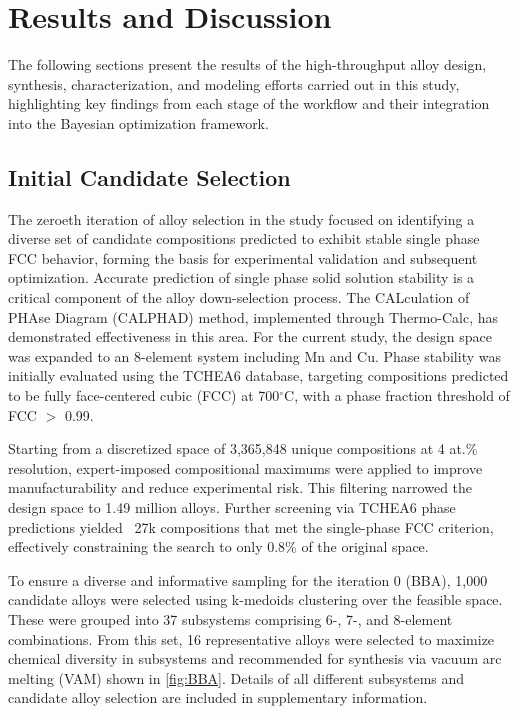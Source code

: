
\section{Results and Discussion}\label{sec:Results}

The following sections present the results of the high-throughput alloy design, synthesis, characterization, and modeling efforts carried out in this study, highlighting key findings from each stage of the workflow and their integration into the Bayesian optimization framework.

\subsection{Initial Candidate Selection}

The zeroeth iteration of alloy selection in the study focused on identifying a diverse set of candidate compositions predicted to exhibit stable single phase FCC behavior, forming the basis for experimental validation and subsequent optimization. Accurate prediction of single phase solid solution stability is a critical component of the alloy down-selection process. The CALculation of PHAse Diagram (CALPHAD) method, implemented through Thermo-Calc, has demonstrated effectiveness in this area. For the current study, the design space was expanded to an 8-element system including Mn and Cu. Phase stability was initially evaluated using the TCHEA6 database, targeting compositions predicted to be fully face-centered cubic (FCC) at 700$^\circ$C, with a phase fraction threshold of FCC $>$ 0.99.

Starting from a discretized space of 3,365,848 unique compositions at 4 at.\% resolution, expert-imposed compositional maximums were applied to improve manufacturability and reduce experimental risk. This filtering narrowed the design space to 1.49 million alloys. Further screening via TCHEA6 phase predictions yielded ~27k compositions that met the single-phase FCC criterion, effectively constraining the search to only 0.8\% of the original space.

To ensure a diverse and informative sampling for the iteration 0 (BBA), 1,000 candidate alloys were selected using k-medoids clustering over the feasible space. These were grouped into 37 subsystems comprising 6-, 7-, and 8-element combinations. From this set, 16 representative alloys were selected to maximize chemical diversity in subsystems and recommended for synthesis via vacuum arc melting (VAM) shown in \autoref{fig:BBA}. Details of all different subsystems and candidate alloy selection are included in supplementary information. 

